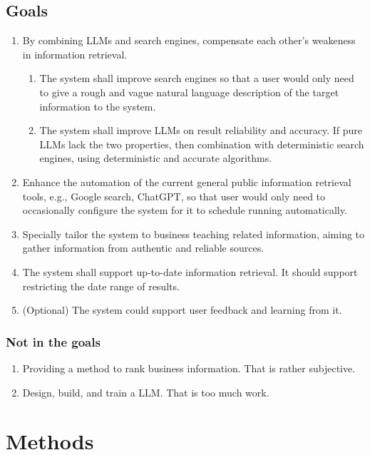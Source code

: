\documentclass[final-report]{report-template}
\begin{document}
\subsection{Goals} \label{sec.intro.goals}
\begin{enumerate}
	\item By combining LLMs and search engines, compensate each other's
		weakeness in information retrieval.
		\begin{enumerate}
		\item The system shall improve search engines so that a user would only
			need to give a rough and vague natural language description of the
			target information to the system.
		\item The system shall improve LLMs on result reliability and
			accuracy. If pure LLMs lack the two properties, then combination
			with deterministic search engines, using deterministic and accurate
			algorithms.
		\end{enumerate}
	\item Enhance the automation of the current general public information
		retrieval tools, e.g., Google search, ChatGPT, so that
		user would only need to occasionally configure the system for it to
		schedule running automatically.
	\item Specially tailor the system to business teaching related information,
		aiming to gather information from authentic and reliable sources.
	\item The system shall support up-to-date information retrieval. It should
		support restricting the date range of results.
	\item (Optional) The system could support user feedback and learning from
		it.
\end{enumerate}

\subsubsection{Not in the goals}
\begin{enumerate}
	\item Providing a method to rank business information. That is rather
		subjective.
	\item Design, build, and train a LLM. That is too much work.
\end{enumerate}

\section{Methods} 
\end{document}
